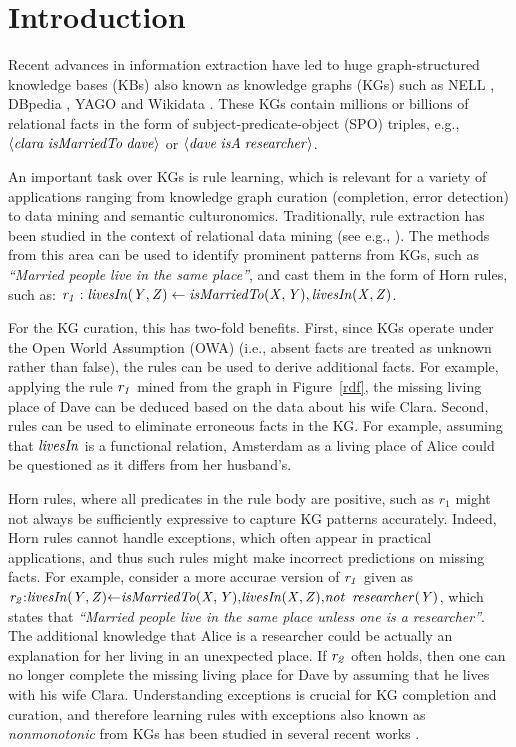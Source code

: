 \section{Introduction}
\label{sec:intro}

Recent advances in information extraction have led to
huge graph-structured knowledge bases (KBs) also known as knowledge graphs (KGs) such as NELL \cite{nell}, DBpedia \cite{dbpedia}, YAGO \cite{yago} and Wikidata \cite{wikidata}. These KGs contain millions or billions of relational facts in the form of subject-predicate-object (SPO) triples, e.g., $\langle\mathit{clara\;isMarriedTo\;dave}\rangle$ or $\langle\mathit{dave\;isA\;researcher}\rangle$. 

An important task over KGs is rule learning, which is relevant for a variety of applications ranging from knowledge graph curation (completion, error detection) \cite{DBLP:journals/semweb/Paulheim17} to data mining and semantic culturonomics. 
Traditionally, rule extraction has been studied in the context of relational data mining (see e.g., \cite{amie,op,rdf2rules}). The methods from this area can be used to identify prominent patterns from KGs, such as \emph{``Married people live in the same
place''}, and cast them in the form of Horn rules, such as:
$\mathit{r_1:\;}\mathit{livesIn(Y,Z)}\leftarrow \mathit{isMarriedTo(X,Y),livesIn(X,Z)}$.

For the KG curation, this has two-fold benefits. First, since KGs operate under the Open World
Assumption (OWA) (i.e., absent facts are treated as unknown rather than false),
the rules can be used to derive additional facts. For example, applying the rule
$\mathit{r_1}$ mined from the graph in Figure~\ref{rdf}, the missing living place of Dave can be deduced based on the data about his wife Clara. Second, rules can be used to eliminate erroneous facts in the KG. For example, assuming
that $\mathit{livesIn}$ is a functional relation, Amsterdam as a living place of
Alice could be questioned as it differs from her husband's.

Horn rules, where all predicates in the rule body are positive, such as $r_1$ might not always be sufficiently expressive %
to capture KG patterns accurately. Indeed, Horn rules cannot handle exceptions, which often appear in practical applications, and thus such rules might make incorrect predictions on missing facts.
For example, consider a more accurae version of $\mathit{r_1}$ given as \\$\mathit{r_2{:}livesIn(Y,Z){\leftarrow}
  isMarriedTo(X,Y){,}livesIn(X,Z){,}{\mathit{not}~ \,} researcher(Y)}$, which \\states that \emph{``Married people live in the same place unless one is a
  researcher''}. The additional knowledge that Alice is a researcher could be actually an explanation for her living in an unexpected place. If $\mathit{r_2}$ often holds, then
one can no longer complete the missing living place for Dave by assuming that he lives with his wife Clara. 
Understanding exceptions is crucial for KG completion and curation, and therefore learning rules with exceptions also known as \emph{nonmonotonic} from KGs has been studied in several recent works \cite{gad2016,rumis}.


